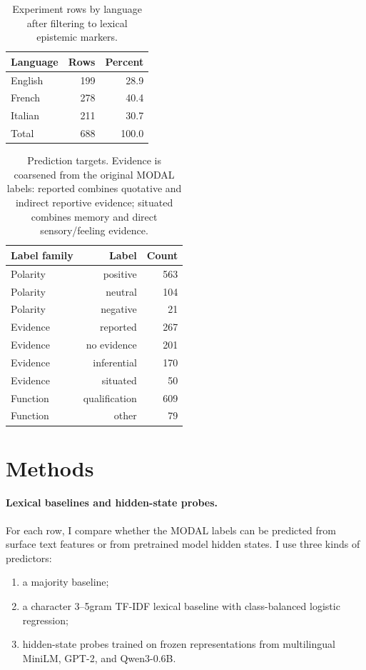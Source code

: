 \documentclass{article}
\begin{document}
\begin{table}[t]
\centering
\small
\begin{tabular}{lrr}
\toprule
Language & Rows & Percent \\
\midrule
English & 199 & 28.9 \\
French & 278 & 40.4 \\
Italian & 211 & 30.7 \\
\midrule
Total & 688 & 100.0 \\
\bottomrule
\end{tabular}
\caption{Experiment rows by language after filtering to lexical epistemic markers.}
\label{tab:data_language}
\end{table}

\begin{table}[t]
\centering
\small
\begin{tabular}{lrr}
\toprule
Label family & Label & Count \\
\midrule
Polarity & positive & 563 \\
Polarity & neutral & 104 \\
Polarity & negative & 21 \\
\midrule
Evidence & reported & 267 \\
Evidence & no evidence & 201 \\
Evidence & inferential & 170 \\
Evidence & situated & 50 \\
\midrule
Function & qualification & 609 \\
Function & other & 79 \\
\bottomrule
\end{tabular}
\caption{Prediction targets. Evidence is coarsened from the original MODAL labels: reported combines quotative and indirect reportive evidence; situated combines memory and direct sensory/feeling evidence.}
\label{tab:data_labels}
\end{table}

\section{Methods}

\paragraph{Lexical baselines and hidden-state probes.}
For each row, I compare whether the MODAL labels can be predicted from surface text features or from pretrained model hidden states. I use three kinds of predictors:
\begin{enumerate}
    \item a majority baseline;
    \item a character 3--5gram TF-IDF lexical baseline with class-balanced logistic regression;
    \item hidden-state probes trained on frozen representations from multilingual MiniLM, GPT-2, and Qwen3-0.6B.
\end{enumerate}
\end{document}
